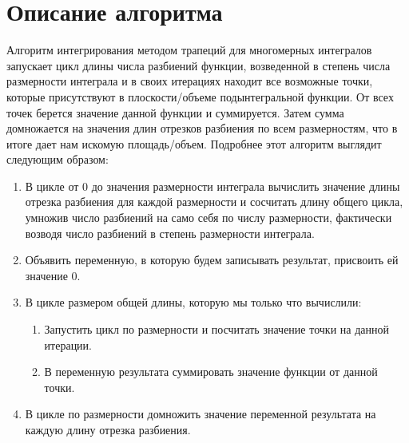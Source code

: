 \documentclass{report}
\begin{document}
\section*{Описание алгоритма}
\par Алгоритм интегрирования методом трапеций для многомерных интегралов запускает цикл длины числа разбиений функции, возведенной в степень числа размерности интеграла и в своих итерациях находит все возможные точки, которые присутствуют в плоскости/объеме подынтегральной функции. От всех точек берется значение данной функции и суммируется. Затем сумма домножается на значения длин отрезков разбиения по всем размерностям, что в итоге дает нам искомую площадь/объем. Подробнее этот алгоритм выглядит следующим образом:
\begin{enumerate}
\item В цикле от 0 до значения размерности интеграла вычислить значение длины отрезка разбиения для каждой размерности и сосчитать длину общего цикла, умножив число разбиений на само себя по числу размерности, фактически возводя число разбиений в степень размерности интеграла.
\item Объявить переменную, в которую будем записывать результат, присвоить ей значение 0.
\item В цикле размером общей длины, которую мы только что вычислили:
  \begin{enumerate}
    \item Запустить цикл по размерности и посчитать значение точки на данной итерации.
    \item В переменную результата суммировать значение функции от данной точки.
  \end{enumerate}
\item В цикле по размерности домножить значение переменной результата на каждую длину отрезка разбиения.
\end{enumerate}
\newpage

\end{document}
